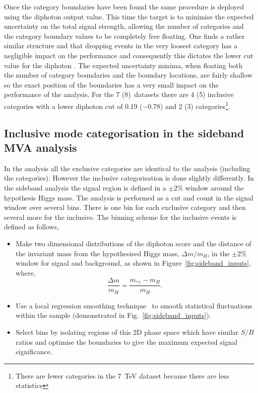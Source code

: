 Once the \VBF category boundaries have been found the same procedure is deployed using the diphoton \BDT output value. This time the target is to minimise the expected uncertainty on the total signal strength, allowing the number of categories and the category boundary values to be completely free floating. One finds a rather similar structure and that dropping events in the very loosest category has a negligible impact on the performance and consequently this dictates the lower cut value for the diphoton \BDT. The expected uncertainty minima, when floating both the number of category boundaries and the boundary locations, are fairly shallow so the exact position of the boundaries has a very small impact on the performance of the analysis. For the 7 (8)~\TeV datasets there are 4 (5) inclusive categories with a lower diphoton \BDT cut of 0.19 ($-0.78$) and 2 (3) \VBF categories\footnote{There are fewer categories in the 7~TeV dataset because there are less statistics}.

\subsection{Inclusive mode categorisation in the sideband \acs{MVA} analysis}
\label{sec:inclusive_cats_sideband}

In the \SMVA analysis all the exclusive categories are identical to the \MFM analysis (including the \VBF categories). However the inclusive categorisation is done slightly differently. In the sideband analysis the signal region is defined in a $\pm2$\% window around the hypothesis Higgs mass. The analysis is performed as a cut and count in the signal window over several bins. There is one bin for each exclusive category and then several more for the inclusive. The binning scheme for the inclusive events is defined as follows,

\begin{itemize}
  \item Make two dimensional distributions of the diphoton \BDT score and the distance of the invariant mass from the hypothesised Higgs mass, $\Delta m/m_{H}$, in the $\pm2$\% window for signal and background, as shown in Figure~\ref{fig:sideband_inputs}, where,
    \begin{equation}
      \frac{\Delta m}{m_{H}} = \frac{m_{\gamma\gamma} - m_{H}}{m_{H}}.
    \end{equation}
  \item Use a local regression smoothing technique~\cite{regression_smoothing} to smooth statistical fluctuations within the sample (demonstrated in Fig.~\ref{fig:sideband_inputs}).
  \item Select bins by isolating regions of this 2D phase space which have similar $S/B$ ratios and optimise the boundaries to give the maximum expected signal significance.   
\end{itemize}

